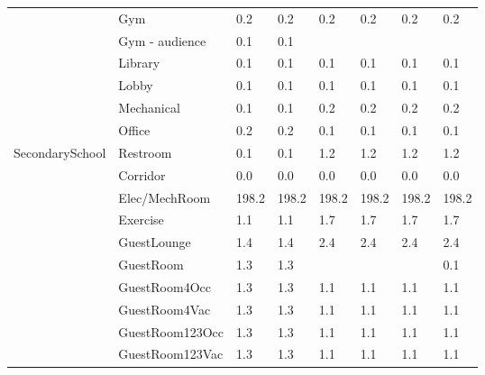 \begin{center}
\begin{longtable}{p{1.25in}p{1in}p{0.5in}p{0.5in}p{0.5in}p{0.5in}p{0.5in}p{0.5in}}
                                   & Gym                                  & 0.2     & 0.2     & 0.2    & 0.2   & 0.2   & 0.2    \\
                                   & Gym - audience                       & 0.1     & 0.1     &        &       &       &        \\
                                   & Library                              & 0.1     & 0.1     & 0.1    & 0.1   & 0.1   & 0.1    \\
                                   & Lobby                                & 0.1     & 0.1     & 0.1    & 0.1   & 0.1   & 0.1    \\
                                   & Mechanical                           & 0.1     & 0.1     & 0.2    & 0.2   & 0.2   & 0.2    \\
                                   & Office                               & 0.2     & 0.2     & 0.1    & 0.1   & 0.1   & 0.1    \\
SecondarySchool                    & Restroom                             & 0.1     & 0.1     & 1.2    & 1.2   & 1.2   & 1.2    \\
                                   & Corridor                             & 0.0     & 0.0     & 0.0    & 0.0   & 0.0   & 0.0    \\
                                   & Elec/MechRoom                        & 198.2   & 198.2   & 198.2  & 198.2 & 198.2 & 198.2  \\
                                   & Exercise                             & 1.1     & 1.1     & 1.7    & 1.7   & 1.7   & 1.7    \\
                                   & GuestLounge                          & 1.4     & 1.4     & 2.4    & 2.4   & 2.4   & 2.4    \\
                                   & GuestRoom                            & 1.3     & 1.3     &        &       &       & 0.1    \\
                                   & GuestRoom4Occ                        & 1.3     & 1.3     & 1.1    & 1.1   & 1.1   & 1.1    \\
                                   & GuestRoom4Vac                        & 1.3     & 1.3     & 1.1    & 1.1   & 1.1   & 1.1    \\
                                   & GuestRoom123Occ                      & 1.3     & 1.3     & 1.1    & 1.1   & 1.1   & 1.1    \\
                                   & GuestRoom123Vac                      & 1.3     & 1.3     & 1.1    & 1.1   & 1.1   & 1.1    \\

\end{longtable}
\end{center}
